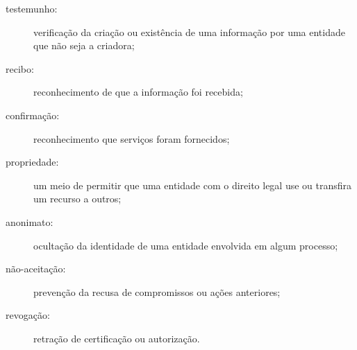 \begin{description}
    \item[testemunho:] verificação da criação ou existência de uma informação por uma
        entidade que não seja a criadora;

    \item[recibo:] reconhecimento de que a informação foi recebida;

    \item[confirmação:] reconhecimento que serviços foram fornecidos;

    \item[propriedade:] um meio de permitir que uma entidade com o direito legal use ou
        transfira um recurso a outros;

    \item[anonimato:] ocultação da identidade de uma entidade envolvida em algum
        processo;

    \item[não-aceitação:] prevenção da recusa de compromissos ou ações anteriores;

    \item[revogação:] retração de certificação ou autorização.
\end{description}
